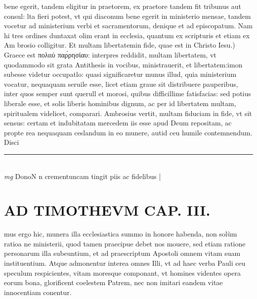 \documentclass{article}
\begin{document}
\begin{pages}
bene egerit, tandem eligitur in praetorem, ex praetore tandem fit tribunus aut consul: lta fieri potest, vt qui diaconum bene egerit in ministerio mensae, tandem vocetur ad ministerium verbi et sacramentorum, denique et ad episcopatum. Nam hi tres ordines duntaxat olim erant in ecclesia, quantum ex scripturis et etiam ex Am brosio colligitur.  \pend\pstart Et multam libertatemin fide, quae est in Christo Iesu.) Graece est πολιιύ παρ́ρησίαυ: interpres reddidit, multam libertatem, vt quodammodo sit grata Antithesis in vocibus, ministrauerit, et libertatem:imon subesse videtur occupatlo: quasi significaretur munus illud, quia ministerium vocatur, nequaquam seruile esse, licet etiam graue sit distribuere pauperibus, inter quos semper sunt querull et morosi, quibus difficillime fatisfacias: sed potius liberale esse, et solis liberis hominibus dignum, ac per id libertatem multam, spiritualem videlicet, comparari. Ambrosius vertit, multam fiduciam in fide, vt sit sensus: certam et indubitatam mercedem iis esse apud Deum repositam, ac propte rea nequaquam ceslandum in eo munere, autid ceu humile contemnendum. Disci\pend
\vspace{0.5cm}\noindent
\vspace{0.2cm}\rule{1cm}{0.2pt}\\ 
\hspace{0.2cm}\textit{mg}
\footnotesize DonoN n crementuncam tingit piis ac fidelibus
\normalsize| 
\section*{AD TIMOTHEVM CAP. III. }
\marginpar{[ p.87 ]}\pstart mus ergo hic, munera illa ecclesiastica summo in honore habenda, non solùm ratioa ne ministerii, quod tamen praecipue debet nos mouere, sed etiam ratione personarum illa subeuntium, et ad praescriptum Apostoli omnem vitam suam instituentium. Atque  admonentur interea omnes Illi, vt ad haec verba Pauli ceu speculum respicientes, vitam moresque componant, vt homines videntes opera eorum bona, glorificent coelestem Patrem, nec non imitari eandem vitae innocentiam conentur.  \pend
{}
{}

\end{pages}
\end{document}
